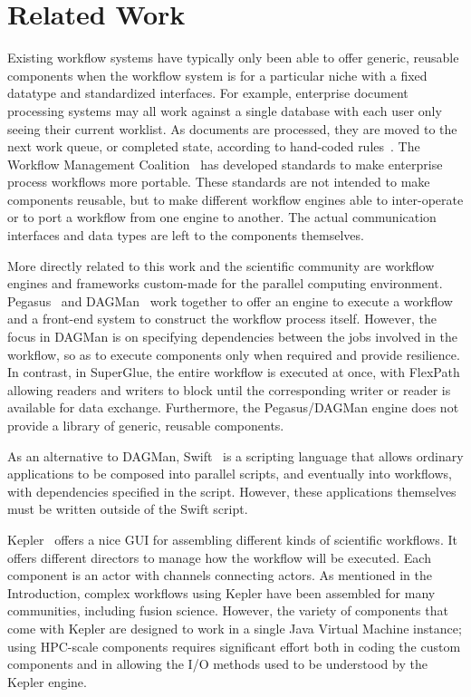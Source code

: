 \section{Related Work}
\label{s:related}

Existing workflow systems have typically only been able to offer generic,
reusable components when the workflow system is for a particular niche with a
fixed datatype and standardized interfaces. For example, enterprise document
processing systems may all work against a single database with each user only
seeing their current worklist. As documents are processed, they are moved to
the next work queue, or completed state, according to hand-coded
rules~\cite{mckesson-workflow}. The Workflow Management Coalition~\cite{wfmc}
has developed standards to make enterprise process workflows more portable.
These standards are not intended to make components reusable, but to make
different workflow engines able to inter-operate or to port a workflow from one
engine to another.  The actual communication interfaces and data types are left
to the components themselves.

More directly related to this work and the scientific community are workflow
engines and frameworks custom-made for the parallel computing environment.
Pegasus~\cite{mullender:pegasus} and DAGMan~\cite{Malewicz:2006:dagman} work
together to offer an engine to execute a workflow and a front-end system to
construct the workflow process itself.
However, the focus in DAGMan is on specifying dependencies between
the jobs involved in the workflow, so as to execute
components only when required and provide resilience.
In contrast, in SuperGlue, the entire workflow is executed at once, with
FlexPath allowing readers and writers to block until
the corresponding writer or reader is available for data exchange.
Furthermore, the Pegasus/DAGMan engine does not provide
a library of generic, reusable components.

As an alternative to DAGMan, Swift~\cite{wilde2011swift}
is a scripting language that allows ordinary applications
to be composed into parallel scripts, and eventually into
workflows, with dependencies specified in the script.
However, these applications themselves
must be written outside of the Swift script.

Kepler~\cite{bertram:2006:kepler} offers a nice GUI for assembling different
kinds of scientific workflows. It offers different directors to manage how the
workflow will be executed. Each component is an actor with channels connecting
actors. As mentioned in the Introduction, complex workflows using Kepler have been
assembled for many communities, including fusion science.
However, the variety of components
that come with Kepler are designed
to work in a single Java Virtual Machine instance;
using HPC-scale components requires significant effort
both in coding the custom components and in
allowing the I/O methods used to be understood by the Kepler engine.

